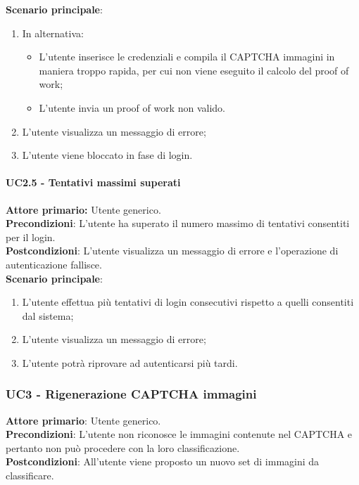 \textbf{Scenario principale}:
\begin{enumerate}
    \item In alternativa:
    \begin{itemize}
        \item L'utente inserisce le credenziali e compila il CAPTCHA immagini in maniera troppo rapida, per cui non viene eseguito il calcolo del proof of work;
        \item L'utente invia un proof of work non valido.
    \end{itemize}
	\item L’utente visualizza un messaggio di errore;
	\item L'utente viene bloccato in fase di login.
\end{enumerate}

\paragraph{UC2.5 - Tentativi massimi superati}
\textbf{Attore primario:} Utente generico.\\
\textbf{Precondizioni}: L'utente ha superato il numero massimo di tentativi consentiti per il login.\\
\textbf{Postcondizioni}: L’utente visualizza un messaggio di errore e l’operazione di autenticazione fallisce.\\

\textbf{Scenario principale}:
\begin{enumerate}
    \item L'utente effettua più tentativi di login consecutivi rispetto a quelli consentiti dal sistema;
	\item L’utente visualizza un messaggio di errore;
	\item L'utente potrà  riprovare ad autenticarsi più tardi.
\end{enumerate}

\subsubsection{UC3 - Rigenerazione CAPTCHA immagini}
\textbf{Attore primario}: Utente generico.\\
\textbf{Precondizioni}: L'utente non riconosce le immagini contenute nel CAPTCHA e pertanto non può procedere con la loro classificazione.\\
\textbf{Postcondizioni}: All'utente viene proposto un nuovo set di immagini da classificare.\\

